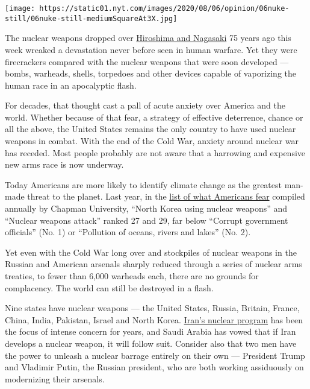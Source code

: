 \texttt{[image: https://static01.nyt.com/images/2020/08/06/opinion/06nuke-still/06nuke-still-mediumSquareAt3X.jpg]}

The nuclear weapons dropped over
\href{https://www.nytimes.com/2020/08/06/world/asia/hiroshima-nagasaki-japan-photos.html}{Hiroshima
and Nagasaki} 75 years ago this week wreaked a devastation never before
seen in human warfare. Yet they were firecrackers compared with the
nuclear weapons that were soon developed --- bombs, warheads, shells,
torpedoes and other devices capable of vaporizing the human race in an
apocalyptic flash.

For decades, that thought cast a pall of acute anxiety over America and
the world. Whether because of that fear, a strategy of effective
deterrence, chance or all the above, the United States remains the only
country to have used nuclear weapons in combat. With the end of the Cold
War, anxiety around nuclear war has receded. Most people probably are
not aware that a harrowing and expensive new arms race is now underway.

Today Americans are more likely to identify climate change as the
greatest man-made threat to the planet. Last year, in the
\href{https://www.chapman.edu/wilkinson/research-centers/babbie-center/survey-american-fears.aspx\#:~:text=Results\%20from\%20the\%202019\%20Chapman,warfare\%20for\%20the\%202019\%20survey.}{list
of what Americans fear} compiled annually by Chapman University, ``North
Korea using nuclear weapons'' and ``Nuclear weapons attack'' ranked 27
and 29, far below ``Corrupt government officials'' (No. 1) or
``Pollution of oceans, rivers and lakes'' (No. 2).

Yet even with the Cold War long over and stockpiles of nuclear weapons
in the Russian and American arsenals sharply reduced through a series of
nuclear arms treaties, to fewer than 6,000 warheads each, there are no
grounds for complacency. The world can still be destroyed in a flash.

Nine states have nuclear weapons --- the United States, Russia, Britain,
France, China, India, Pakistan, Israel and North Korea.
\href{https://www.nytimes.com/2020/08/01/world/asia/iran-khamenei-us-sanctions.html}{Iran's
nuclear program} has been the focus of intense concern for years, and
Saudi Arabia has vowed that if Iran develops a nuclear weapon, it will
follow suit. Consider also that two men have the power to unleash a
nuclear barrage entirely on their own --- President Trump and Vladimir
Putin, the Russian president, who are both working assiduously on
modernizing their arsenals.

